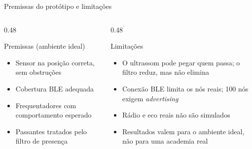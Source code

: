 \documentclass[aspectratio=169,11pt]{beamer}
\begin{document}
\begin{frame}[t]{Premissas do protótipo e limitações}
  \begin{columns}[T]
    \begin{column}{0.48\textwidth}
      \begin{block}{Premissas (ambiente ideal)}
        \footnotesize
        \begin{itemize}
          \item Sensor na posição correta, sem obstruções
          \item Cobertura BLE adequada
          \item Frequentadores com comportamento esperado
          \item Passantes tratados pelo filtro de presença
        \end{itemize}
      \end{block}
    \end{column}
    \begin{column}{0.48\textwidth}
      \begin{block}{Limitações}
        \footnotesize
        \begin{itemize}
          \item O ultrassom pode pegar quem passa; o filtro reduz, mas não elimina
          \item Conexão BLE limita os nós reais; 100 nós exigem \emph{advertising}
          \item Rádio e eco reais não são simulados
          \item Resultados valem para o ambiente ideal, não para uma academia real
        \end{itemize}
      \end{block}
    \end{column}
  \end{columns}
\end{frame}
\end{document}
